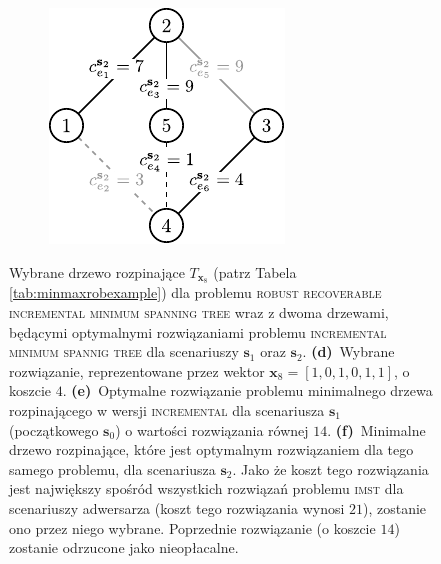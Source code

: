 \begin{figure}[!htbp]
\begin{subfigure}[b]{0.3\textwidth}
		\caption{}
		\label{fig:robincrexample:e}
	\end{subfigure}
	\hfill
	\begin{subfigure}[b]{0.3\textwidth}
		\includegraphics[width=\textwidth]{Chapter_II/ROB-INC-MST-example/c2}
		\caption{}
		\label{fig:robincrexample:f}
	\end{subfigure}
	\hfill\null
	\caption{
		Wybrane drzewo rozpinające $T_{\textbf{x}_{8}}$ (patrz Tabela \ref{tab:minmaxrobexample}) dla problemu \textsc{robust recoverable incremental minimum spanning tree} wraz z dwoma drzewami, będącymi optymalnymi rozwiązaniami problemu \textsc{incremental minimum spannig tree} dla scenariuszy $\textbf{s}_{1}$ oraz $\textbf{s}_{2}$.
		\textbf{(d)}~Wybrane rozwiązanie, reprezentowane przez wektor $\textbf{x}_{8} = \left[ 1, 0, 1, 0, 1, 1 \right]$, o koszcie $4$.
		\textbf{(e)}~Optymalne rozwiązanie problemu minimalnego drzewa rozpinającego w wersji \textsc{incremental} dla scenariusza $\textbf{s}_{1}$ (początkowego $\textbf{s}_{0}$) o wartości rozwiązania równej $14$.
		\textbf{(f)}~Minimalne drzewo rozpinające, które jest optymalnym rozwiązaniem dla tego samego problemu, dla scenariusza $\textbf{s}_{2}$. Jako że koszt tego rozwiązania jest największy spośród wszystkich rozwiązań problemu \textsc{imst} dla scenariuszy adwersarza (koszt tego rozwiązania wynosi $21$), zostanie ono przez niego wybrane. Poprzednie rozwiązanie (o koszcie $14$) zostanie odrzucone jako nieopłacalne.
	}
	\label{fig:robincrexample}
\end{figure}
